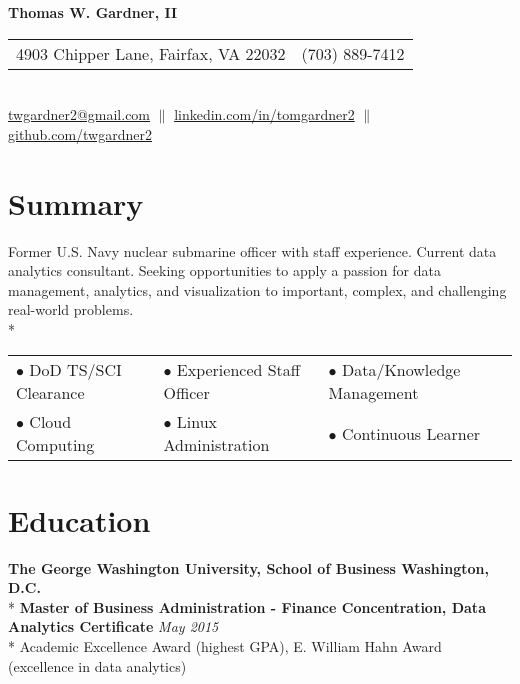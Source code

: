 \documentclass{article}
\begin{document}
\begin{center} 
\textbf{\LARGE Thomas W. Gardner, II} \\
\begin{tabular}{@{} l l}
	4903 Chipper Lane, Fairfax, VA 22032 	& (703) 889-7412 \\
\end{tabular} \\
\href{mailto:twgardner2@gmail.com}{twgardner2@gmail.com} $\parallel$ \href{https://www.linkedin.com/in/tomgardner2}{linkedin.com/in/tomgardner2} $\parallel$ \href{https://www.github.com/twgardner2}{github.com/twgardner2} \\
\end{center}
\section{Summary}
Former U.S. Navy nuclear submarine officer with staff experience. Current data analytics consultant. Seeking opportunities to apply a passion for data management, analytics, and visualization to important, complex, and challenging real-world problems. \\*
\begin{minipage}{\textwidth}

\vspace{0.25cm}
\centering
\begin{tabular}{@{}p{5cm} p{5cm} p{5cm}}
	$\bullet$ DoD TS/SCI Clearance	& $\bullet$ Experienced Staff Officer	& $\bullet$ Data/Knowledge Management \\*
	$\bullet$ Cloud Computing 		& $\bullet$ Linux Administration 		& $\bullet$ Continuous Learner \\*
\end{tabular}
\end{minipage}

\section{Education} 

\textbf{The George Washington University, School of Business \hfill Washington, D.C.} \\*
\textbf{Master of Business Administration - Finance Concentration, Data Analytics Certificate} \hfill \textit{May 2015} \\*
\textendash Academic Excellence Award (highest GPA), E. William Hahn Award (excellence in data analytics)\\
\end{document}
